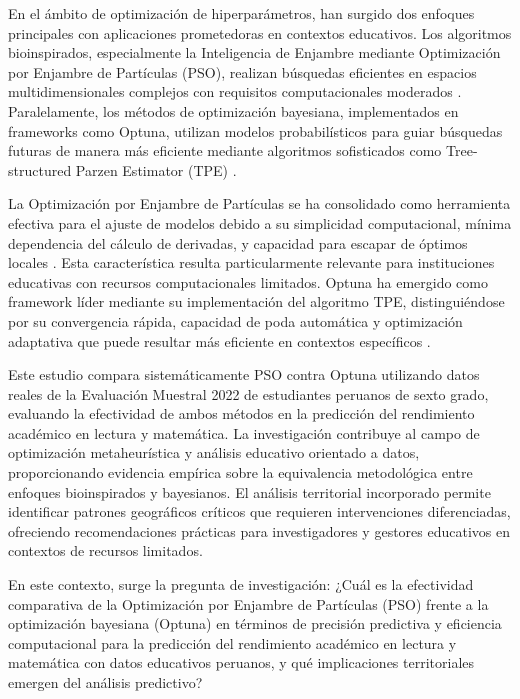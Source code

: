 \documentclass[conference]{IEEEtran}
\begin{document}
En el ámbito de optimización de hiperparámetros, han surgido dos enfoques principales con aplicaciones prometedoras en contextos educativos. Los algoritmos bioinspirados, especialmente la Inteligencia de Enjambre mediante Optimización por Enjambre de Partículas (PSO), realizan búsquedas eficientes en espacios multidimensionales complejos con requisitos computacionales moderados \cite{kennedy1995particle}. Paralelamente, los métodos de optimización bayesiana, implementados en frameworks como Optuna, utilizan modelos probabilísticos para guiar búsquedas futuras de manera más eficiente mediante algoritmos sofisticados como Tree-structured Parzen Estimator (TPE) \cite{bergstra2013making}.

La Optimización por Enjambre de Partículas se ha consolidado como herramienta efectiva para el ajuste de modelos debido a su simplicidad computacional, mínima dependencia del cálculo de derivadas, y capacidad para escapar de óptimos locales \cite{kennedy1995particle}. Esta característica resulta particularmente relevante para instituciones educativas con recursos computacionales limitados. Optuna ha emergido como framework líder mediante su implementación del algoritmo TPE, distinguiéndose por su convergencia rápida, capacidad de poda automática y optimización adaptativa que puede resultar más eficiente en contextos específicos \cite{akiba2019optuna}.

Este estudio compara sistemáticamente PSO contra Optuna utilizando datos reales de la Evaluación Muestral 2022 de estudiantes peruanos de sexto grado, evaluando la efectividad de ambos métodos en la predicción del rendimiento académico en lectura y matemática. La investigación contribuye al campo de optimización metaheurística y análisis educativo orientado a datos, proporcionando evidencia empírica sobre la equivalencia metodológica entre enfoques bioinspirados y bayesianos. El análisis territorial incorporado permite identificar patrones geográficos críticos que requieren intervenciones diferenciadas, ofreciendo recomendaciones prácticas para investigadores y gestores educativos en contextos de recursos limitados.

En este contexto, surge la pregunta de investigación: ¿Cuál es la efectividad comparativa de la Optimización por Enjambre de Partículas (PSO) frente a la optimización bayesiana (Optuna) en términos de precisión predictiva y eficiencia computacional para la predicción del rendimiento académico en lectura y matemática con datos educativos peruanos, y qué implicaciones territoriales emergen del análisis predictivo?
\end{document}
